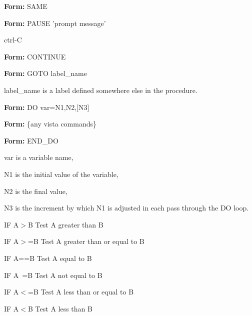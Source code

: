 {\newpage\clearpage
{}%
\begin{command} 
  \item[\textbf{Form: } SAME\hfill]{}
\end{command}%
\lthtmlfigureZ
\lthtmlcheckvsize\clearpage}

{\newpage\clearpage
{}%
\begin{command}
\item[\textbf{Form: } PAUSE 'prompt message'\hfill]{}
\item[ctrl-C\hfill]{}
\end{command}%
\lthtmlfigureZ
\lthtmlcheckvsize\clearpage}

{\newpage\clearpage
{}%
\begin{command}
  \item[\textbf{Form: } CONTINUE\hfill]{}
\end{command}%
\lthtmlfigureZ
\lthtmlcheckvsize\clearpage}

{\newpage\clearpage
{}%
\begin{command}
  \item[\textbf{Form: } GOTO label\_name\hfill]{}
  \item[label\_name]{is a label defined somewhere else in the procedure.}
\end{command}%
\lthtmlfigureZ
\lthtmlcheckvsize\clearpage}

{\newpage\clearpage
{}%
\begin{command}
  \item[\textbf{Form: } DO var=N1,N2,{[N3]}\hfill]{}
  \item[\textbf{Form: } \{any vista commands\}\hfill]{}
  \item[\textbf{Form: } END\_DO\hfill]{}
  \item[var]{is a variable name,}
  \item[N1]{is the initial value of the variable,}
  \item[N2]{is the final value,}
  \item[N3]{is the increment by which N1 is adjusted in
       each pass through the DO loop.}
\end{command}%
\lthtmlfigureZ
\lthtmlcheckvsize\clearpage}

{\newpage\clearpage
{}%
\begin{example}
  \item[IF A$>$B\hfill]{Test A greater than B}
  \item[IF A$>$=B\hfill]{Test A greater than or equal to B}
  \item[IF A==B\hfill]{Test A equal to B}
  \item[IF A~=B\hfill]{Test A not equal to B}
  \item[IF A$<$=B\hfill]{Test A less than or equal to B}
  \item[IF A$<$B\hfill]{Test A less than B}
\end{example}%
\lthtmlfigureZ
\lthtmlcheckvsize\clearpage}

